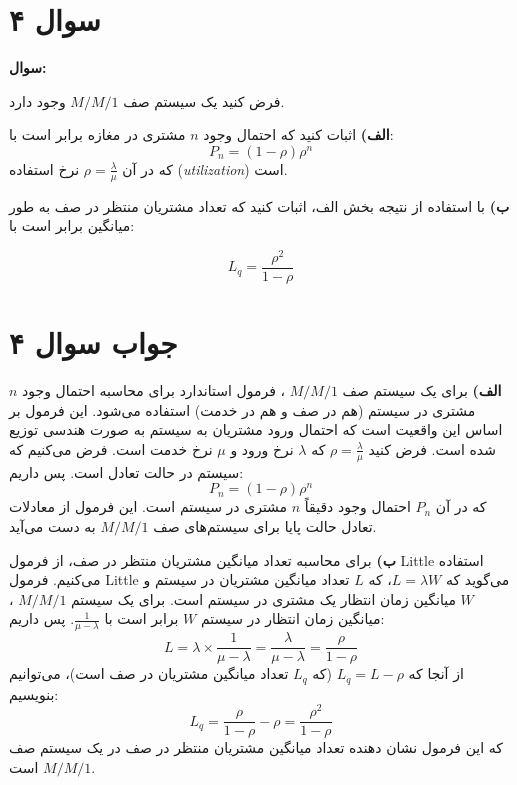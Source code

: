 \section*{سوال ۴}
	
\textbf{سوال:}
	
فرض کنید یک سیستم صف
$M/M/1$
وجود دارد. 
	
\textbf{الف)} اثبات کنید که احتمال وجود \(n\) مشتری در مغازه برابر است با:
\[
P_n = (1 - \rho)\rho^n
\]
که در آن \(\rho = \frac{\lambda}{\mu}\) نرخ استفاده (\textit{utilization}) است.
	
\textbf{ب)} با استفاده از نتیجه بخش الف، اثبات کنید که تعداد مشتریان منتظر در صف به طور میانگین برابر است با:

\[
L_q = \frac{\rho^2}{1 - \rho}
\]

\section*{جواب سوال ۴}

\textbf{الف)} برای یک سیستم صف 
$M/M/1$
، فرمول استاندارد برای محاسبه احتمال وجود \(n\) مشتری در سیستم (هم در صف و هم در خدمت) استفاده می‌شود. این فرمول بر اساس این واقعیت است که احتمال ورود مشتریان به سیستم به صورت هندسی توزیع شده است. فرض کنید \(\rho = \frac{\lambda}{\mu}\) که \(\lambda\) نرخ ورود و \(\mu\) نرخ خدمت است. فرض می‌کنیم که سیستم در حالت تعادل است. پس داریم:
\[
P_n = (1 - \rho)\rho^n
\]
که در آن \(P_n\) احتمال وجود دقیقاً \(n\) مشتری در سیستم است. این فرمول از معادلات تعادل حالت پایا برای سیستم‌های صف 
$M/M/1$
به دست می‌آید. 

\textbf{ب)} برای محاسبه تعداد میانگین مشتریان منتظر در صف، از فرمول Little استفاده می‌کنیم. فرمول Little می‌گوید که \(L = \lambda W\)، که \(L\) تعداد میانگین مشتریان در سیستم و \(W\) میانگین زمان انتظار یک مشتری در سیستم است. برای یک سیستم 
$M/M/1$
، میانگین زمان انتظار در سیستم \(W\) برابر است با \(\frac{1}{\mu - \lambda}\). پس داریم:
\[
L = \lambda \times \frac{1}{\mu - \lambda} = \frac{\lambda}{\mu - \lambda} = \frac{\rho}{1 - \rho}
\]
از آنجا که \(L_q = L - \rho\) (که \(L_q\) تعداد میانگین مشتریان در صف است)، می‌توانیم بنویسیم:
\[
L_q = \frac{\rho}{1 - \rho} - \rho = \frac{\rho^2}{1 - \rho}
\]
که این فرمول نشان دهنده تعداد میانگین مشتریان منتظر در صف در یک سیستم صف 
$M/M/1$
است.
